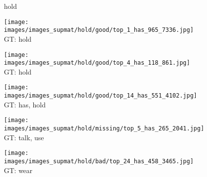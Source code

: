 \documentclass[10pt,twocolumn,letterpaper]{article}
\begin{document}
\begin{figure*}[t]
    
	\begin{minipage}[t]{0.005\textwidth}
    	\centering
    	\vspace{-9.5ex}
    	\begin{turn}{90}
    	hold
    	\end{turn}
    	\vspace{2ex}
    \end{minipage}
    \hspace{0.01\textwidth}
	\begin{minipage}[t]{0.18\textwidth}
    	\centering
       	\texttt{[image: images/images\_supmat/hold/good/top\_1\_has\_965\_7336.jpg]}\\
       	\vspace{0.3ex}
       	GT: hold
       	\vspace{2ex}
    \end{minipage}
    \hspace{0.005\textwidth}
	\begin{minipage}[t]{0.18\textwidth}
    	\centering
       	\texttt{[image: images/images\_supmat/hold/good/top\_4\_has\_118\_861.jpg]}\\
       	\vspace{0.3ex}
       	GT: hold
       	\vspace{0.2ex}
    \end{minipage}
    \hspace{0.005\textwidth}
    \begin{minipage}[t]{0.18\textwidth}
    	\centering
      	\texttt{[image: images/images\_supmat/hold/good/top\_14\_has\_551\_4102.jpg]}\\
      	\vspace{0.3ex}
       	GT: has, hold
       	\vspace{0.2ex}
    \end{minipage}
    \hspace{0.005\textwidth}
	\begin{minipage}[t]{0.18\textwidth}
    	\centering
       	\texttt{[image: images/images\_supmat/hold/missing/top\_5\_has\_265\_2041.jpg]}\\
       	\vspace{0.3ex}
       	GT: talk, use
       	\vspace{0.2ex}
    \end{minipage}
    \hspace{0.005\textwidth}
    \begin{minipage}[t]{0.18\textwidth}
    	\centering
       	\texttt{[image: images/images\_supmat/hold/bad/top\_24\_has\_458\_3465.jpg]} \\
       	\vspace{0.3ex}
       	GT: wear
       	\vspace{0.2ex}
    \end{minipage}
     	

\end{figure*}
\end{document}
